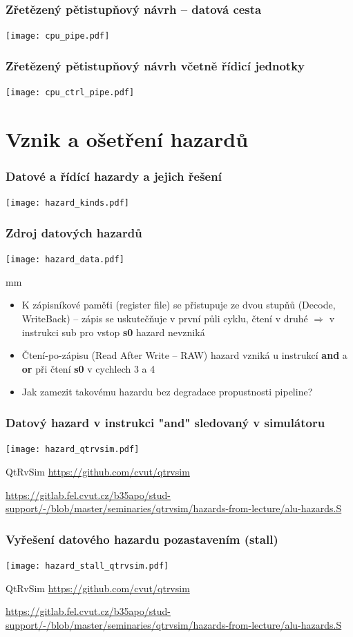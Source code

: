 \documentclass{beamer}
\begin{document}
\begin{frame}
\frametitle{Zřetězený pětistupňový návrh -- datová cesta}
\texttt{[image: cpu\_pipe.pdf]}
\end{frame}

\begin{frame}
\frametitle{Zřetězený pětistupňový návrh včetně řídicí jednotky}
\texttt{[image: cpu\_ctrl\_pipe.pdf]}
\end{frame}

\section{Vznik a ošetření hazardů}

\begin{frame}
\frametitle{Datové a řídící hazardy a jejich řešení}
\texttt{[image: hazard\_kinds.pdf]}
\end{frame}

\begin{frame}
\frametitle{Zdroj datových hazardů}
\texttt{[image: hazard\_data.pdf]}

 mm

\begin{itemize}
 \item K zápisníkové paměťi (register file) se přistupuje ze dvou stupňů (Decode, WriteBack) --
       zápis se uskutečňuje v první půli cyklu, čtení v druhé $\Rightarrow$ v instrukci sub pro vstop \textbf{s0} hazard nevzniká
 \item Čtení-po-zápisu (Read After Write -- RAW) hazard vzniká u instrukcí
       \textbf{and} a \textbf{or} při čtení \textbf{s0} v cychlech 3 a 4
 \item Jak zamezit takovému hazardu bez degradace propustnosti pipeline?
\end{itemize}

\end{frame}


\begin{frame}
\frametitle{Datový hazard v instrukci "and" sledovaný v simulátoru}
\texttt{[image: hazard\_qtrvsim.pdf]}

{\tiny
QtRvSim \url{https://github.com/cvut/qtrvsim}
}

{\Tiny
\url{https://gitlab.fel.cvut.cz/b35apo/stud-support/-/blob/master/seminaries/qtrvsim/hazards-from-lecture/alu-hazards.S}
}

\end{frame}

\begin{frame}
\frametitle{Vyřešení datového hazardu pozastavením (stall)}
\texttt{[image: hazard\_stall\_qtrvsim.pdf]}

{\tiny
QtRvSim \url{https://github.com/cvut/qtrvsim}
}

{\Tiny
\url{https://gitlab.fel.cvut.cz/b35apo/stud-support/-/blob/master/seminaries/qtrvsim/hazards-from-lecture/alu-hazards.S}
}

\end{frame}
\end{document}
